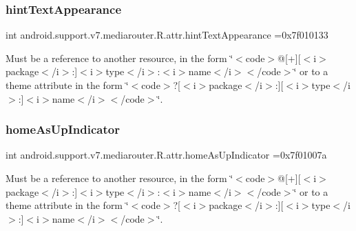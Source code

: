 \subsubsection{\texorpdfstring{hint\+Text\+Appearance}{hintTextAppearance}}
{\footnotesize\ttfamily int android.\+support.\+v7.\+mediarouter.\+R.\+attr.\+hint\+Text\+Appearance =0x7f010133\hspace{0.3cm}{\ttfamily [static]}}

Must be a reference to another resource, in the form \char`\"{}$<$code$>$@\mbox{[}+\mbox{]}\mbox{[}$<$i$>$package$<$/i$>$\+:\mbox{]}$<$i$>$type$<$/i$>$\+:$<$i$>$name$<$/i$>$$<$/code$>$\char`\"{} or to a theme attribute in the form \char`\"{}$<$code$>$?\mbox{[}$<$i$>$package$<$/i$>$\+:\mbox{]}\mbox{[}$<$i$>$type$<$/i$>$\+:\mbox{]}$<$i$>$name$<$/i$>$$<$/code$>$\char`\"{}. \mbox{\label{classandroid_1_1support_1_1v7_1_1mediarouter_1_1R_1_1attr_aef82f0702653b8305457086c422d866c}} 
\subsubsection{\texorpdfstring{home\+As\+Up\+Indicator}{homeAsUpIndicator}}
{\footnotesize\ttfamily int android.\+support.\+v7.\+mediarouter.\+R.\+attr.\+home\+As\+Up\+Indicator =0x7f01007a\hspace{0.3cm}{\ttfamily [static]}}

Must be a reference to another resource, in the form \char`\"{}$<$code$>$@\mbox{[}+\mbox{]}\mbox{[}$<$i$>$package$<$/i$>$\+:\mbox{]}$<$i$>$type$<$/i$>$\+:$<$i$>$name$<$/i$>$$<$/code$>$\char`\"{} or to a theme attribute in the form \char`\"{}$<$code$>$?\mbox{[}$<$i$>$package$<$/i$>$\+:\mbox{]}\mbox{[}$<$i$>$type$<$/i$>$\+:\mbox{]}$<$i$>$name$<$/i$>$$<$/code$>$\char`\"{}. \mbox{\label{classandroid_1_1support_1_1v7_1_1mediarouter_1_1R_1_1attr_ab1808031f49fef5d4045c7311bc2d9f2}} 
